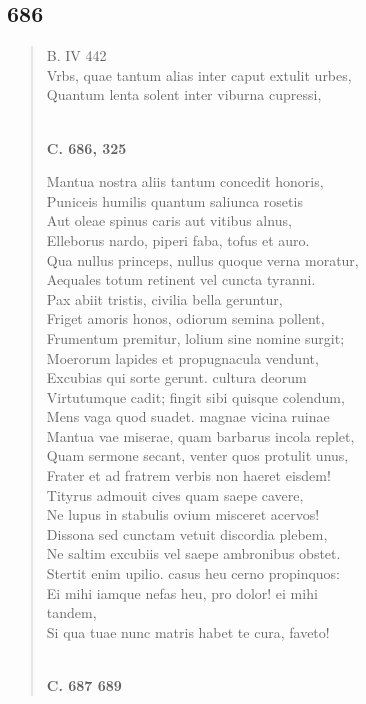 \documentclass[11pt, a4paper]{report}
\begin{document}
            \subsection*{686}
      \begin{verse}
      B. IV 442 \\ Vrbs, quae tantum alias inter caput extulit urbes, \\ Quantum lenta solent inter viburna cupressi, \\ 
        ﻿\pagebreak 
     \marginpar{[160]} \begin{center} \textbf{C. 686, 325} \end{center}Mantua nostra aliis tantum concedit honoris, \\ Puniceis humilis quantum saliunca rosetis \\ Aut oleae spinus caris aut vitibus alnus, \\ Elleborus nardo, piperi faba, tofus et auro. \\ Qua nullus princeps, nullus quoque verna moratur, \\ Aequales totum retinent vel cuncta tyranni. \\ Pax abiit tristis, civilia bella geruntur, \\ Friget amoris honos, odiorum semina pollent, \\ Frumentum premitur, lolium sine nomine surgit; \\ Moerorum lapides et propugnacula vendunt, \\ Excubias qui sorte gerunt. cultura deorum \\ Virtutumque cadit; fingit sibi quisque colendum, \\ Mens vaga quod suadet. magnae vicina ruinae \\ Mantua vae miserae, quam barbarus incola replet, \\ Quam sermone secant, venter quos protulit unus, \\ Frater et ad fratrem verbis non haeret eisdem! \\ Tityrus admouit cives quam saepe cavere, \\ Ne lupus in stabulis ovium misceret acervos! \\ Dissona sed cunctam vetuit discordia plebem, \\ Ne saltim excubiis vel saepe ambronibus obstet. \\ Stertit enim upilio. casus heu cerno propinquos: \\ Ei mihi iamque nefas heu, pro dolor! ei mihi \\ tandem, \\ Si qua tuae nunc matris habet te cura, faveto! \\ 
        ﻿\pagebreak 
    \begin{center} \textbf{C. 687 689} \end{center} \marginpar{[161]} 
      \end{verse}
  
\end{document}
